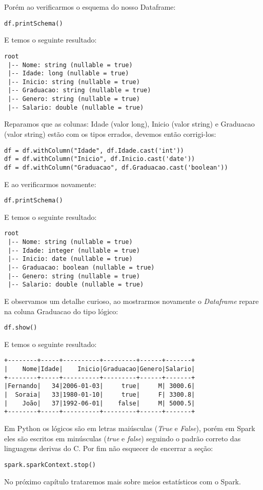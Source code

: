 Porém ao verificarmos o esquema do nosso Dataframe:
\begin{lstlisting}[]
df.printSchema()
\end{lstlisting}

E temos o seguinte resultado: \vspace{-1.5em}
\begin{verbatim}
root
 |-- Nome: string (nullable = true)
 |-- Idade: long (nullable = true)
 |-- Inicio: string (nullable = true)
 |-- Graduacao: string (nullable = true)
 |-- Genero: string (nullable = true)
 |-- Salario: double (nullable = true)
\end{verbatim}

Reparamos que as colunas: Idade (valor long), Inicio (valor string) e Graduacao (valor string) estão com os tipos errados, devemos então corrigi-los:
\begin{lstlisting}[]
df = df.withColumn("Idade", df.Idade.cast('int'))
df = df.withColumn("Inicio", df.Inicio.cast('date'))
df = df.withColumn("Graduacao", df.Graduacao.cast('boolean'))
\end{lstlisting}

E ao verificarmos novamente:
\begin{lstlisting}[]
df.printSchema()
\end{lstlisting}

E temos o seguinte resultado: \vspace{-1.5em}
\begin{verbatim}
root
 |-- Nome: string (nullable = true)
 |-- Idade: integer (nullable = true)
 |-- Inicio: date (nullable = true)
 |-- Graduacao: boolean (nullable = true)
 |-- Genero: string (nullable = true)
 |-- Salario: double (nullable = true)
\end{verbatim}

E observamos um detalhe curioso, ao mostrarmos novamente o \textit{Dataframe} repare na coluna Graduacao do tipo lógico:
\begin{lstlisting}[]
df.show()
\end{lstlisting}

E temos o seguinte resultado: \vspace{-1.5em}
\begin{verbatim}
+--------+-----+----------+---------+------+-------+
|    Nome|Idade|    Inicio|Graduacao|Genero|Salario|
+--------+-----+----------+---------+------+-------+
|Fernando|   34|2006-01-03|     true|     M| 3000.6|
|  Soraia|   33|1980-01-10|     true|     F| 3300.8|
|    João|   37|1992-06-01|    false|     M| 5000.5|
+--------+-----+----------+---------+------+-------+
\end{verbatim}

Em Python os lógicos são em letras maiúsculas (\textit{True} e \textit{False}), porém em Spark eles são escritos em minúsculas (\textit{true} e \textit{false}) seguindo o padrão correto das linguagens derivas do C. Por fim não esquecer de encerrar a seção:
\begin{lstlisting}[]
spark.sparkContext.stop()
\end{lstlisting}

No próximo capítulo trataremos mais sobre meios estatísticos com o Spark.

\clearpage